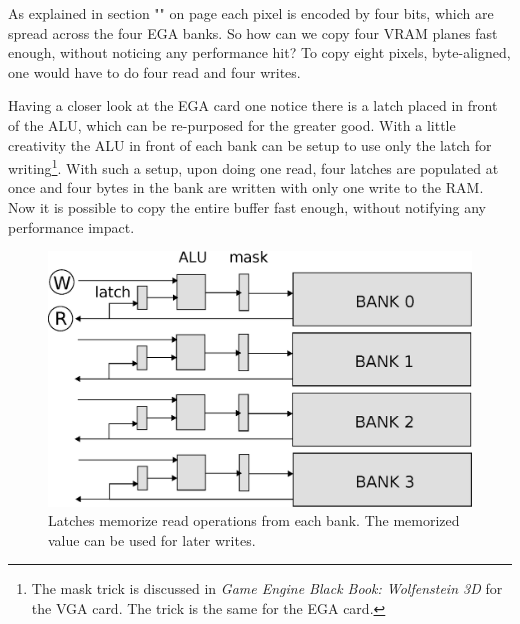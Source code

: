 \documentclass[book.tex]{subfiles}
\begin{document}
\par
\begin{minipage}{\textwidth}
  
  \end{minipage}
  \label{ega_refresh}
  \par
As explained in section "" on page \pageref{section:ega_memmap} each pixel is encoded by four bits, which are spread across the four EGA banks. So how can we copy four VRAM planes fast enough, without noticing any performance hit? To copy eight pixels, byte-aligned, one would have to do four read and four writes.\\

\par
Having a closer look at the EGA card one notice there is a latch placed in front of the ALU, which can be re-purposed for the greater good. With a little creativity the ALU in front of each bank can be setup to use only the latch for writing\footnote{The mask trick is discussed in \textit{Game Engine Black Book: Wolfenstein 3D} for the VGA card. The trick is the same for the EGA card.}. With such a setup, upon doing one read, four latches are populated at once and four bytes in the bank are written with only one write to the RAM. Now it is possible to copy the entire buffer fast enough, without notifying any performance impact.\\ 

\par
 \begin{figure}[H]
\centering
 \includegraphics[width=\textwidth]{imgs/drawings/latches.eps}
 \caption{Latches memorize read operations from each bank. The memorized value can be used for later writes.}
 \end{figure}
 
\end{document}
